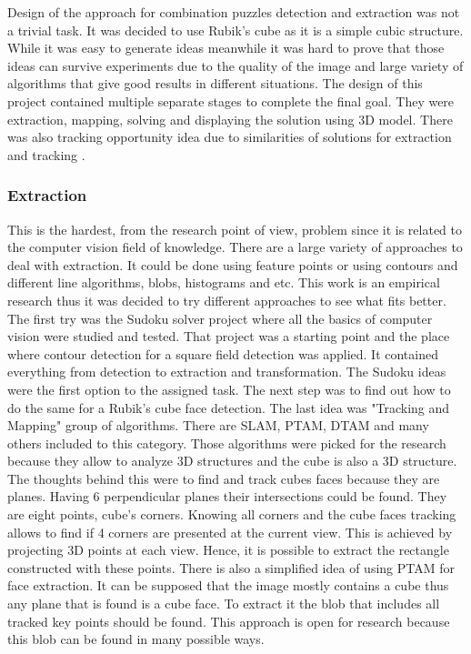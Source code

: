 \documentclass[../../main.tex]{subfiles}
\begin{document}
Design of the approach for combination puzzles detection and extraction was not a trivial task. It was decided to use Rubik's cube as it is a simple cubic structure. While it was easy to generate ideas meanwhile it was hard to prove that those ideas can survive experiments due to the quality of the image and large variety of algorithms that give good results in different situations. The design of this project contained multiple separate stages to complete the final goal. They were extraction, mapping, solving and displaying the solution using 3D model. There was also tracking opportunity idea due to similarities of solutions for extraction and tracking \cite{puzzle_games_solver_q4_zakharov}.

\subsubsection*{Extraction}

This is the hardest, from the research point of view, problem since it is related to the computer vision field of knowledge. There are a large variety of approaches to deal with extraction. It could be done using feature points or using contours and different line algorithms, blobs, histograms and etc. This work is an empirical research thus it was decided to try different approaches to see what fits better. The first try was the Sudoku solver project where all the basics of computer vision were studied and tested. That project was a starting point and the place where contour detection for a square field detection was applied. It contained everything from detection to extraction and transformation. The Sudoku ideas were the first option to the assigned task. The next step was to find out how to do the same for a Rubik's cube face detection. The last idea was "Tracking and Mapping" group of algorithms. There are \ac{SLAM}, \ac{PTAM}, \ac{DTAM} and many others included to this category. Those algorithms were picked for the research because they allow to analyze 3D structures and the cube is also a 3D structure. The thoughts behind this were to find and track cubes faces because they are planes. Having 6 perpendicular planes their intersections could be found. They are eight points, cube's corners. Knowing all corners and the cube faces tracking allows to find if 4 corners are presented at the current view. This is achieved by projecting 3D points at each view. Hence, it is possible to extract the rectangle constructed with these points.
There is also a simplified idea of using \ac{PTAM} for face extraction. It can be supposed that the image mostly contains a cube thus any plane that is found is a cube face. To extract it the blob that includes all tracked key points should be found. This approach is open for research because this blob can be found in many possible ways.
\end{document}
